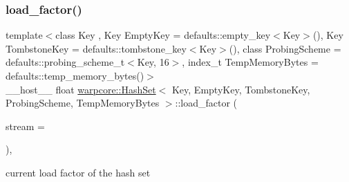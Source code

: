 \subsubsection{\texorpdfstring{load\+\_\+factor()}{load\_factor()}}
{\footnotesize\ttfamily template$<$class Key , Key Empty\+Key = defaults\+::empty\+\_\+key$<$\+Key$>$(), Key Tombstone\+Key = defaults\+::tombstone\+\_\+key$<$\+Key$>$(), class Probing\+Scheme  = defaults\+::probing\+\_\+scheme\+\_\+t$<$\+Key, 16$>$, index\+\_\+t Temp\+Memory\+Bytes = defaults\+::temp\+\_\+memory\+\_\+bytes()$>$ \\
\+\_\+\+\_\+host\+\_\+\+\_\+ float \hyperlink{classwarpcore_1_1HashSet}{warpcore\+::\+Hash\+Set}$<$ Key, Empty\+Key, Tombstone\+Key, Probing\+Scheme, Temp\+Memory\+Bytes $>$\+::load\+\_\+factor (\begin{DoxyParamCaption}\item[{cuda\+Stream\+\_\+t}]{stream = {} }\end{DoxyParamCaption})\hspace{0.3cm}{\ttfamily [inline]}, {\ttfamily [noexcept]}}



current load factor of the hash set 


